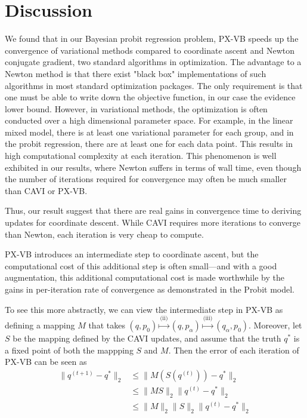 \documentclass{article}
\begin{document}
\section{Discussion}
We found that in our Bayesian probit regression problem, PX-VB speeds up the convergence of variational methods compared to coordinate ascent and Newton conjugate gradient, two standard algorithms in optimization. The advantage to a Newton method is that there exist "black box" implementations of such algorithms in most standard optimization packages. The only requirement is that one must be able to write down the objective function, in our case the evidence lower bound. However, in variational methods, the optimization is often conducted over a high dimensional parameter space. For example, in the linear mixed model, there is at least one variational parameter for each group, and in the probit regression, there are at least one for each data point. This results in high computational complexity at each iteration. This phenomenon is well exhibited in our results, where Newton suffers in terms of wall time, even though the number of iterations required for convergence may often be much smaller than CAVI or PX-VB. 

Thus, our result suggest that there are real gains in convergence time to deriving updates for coordinate descent. While CAVI requires more iterations to converge than Newton, each iteration is very cheap to compute. 


PX-VB introduces an intermediate step to coordinate ascent, but the computational cost of this additional step is often small---and with a good augmentation, this additional computational cost is made worthwhile by the gains in per-iteration rate of convergence as demonstrated in the Probit model.

To see this more abstractly, we can view the intermediate step in PX-VB as defining a mapping $M$ that takes $(q, p_0) \stackrel{\text{(ii)}}{\mapsto} (q, p_\alpha) \stackrel{\text{(iii)}}{\mapsto} (q_\alpha, p_0)$. Moreover, let $S$ be the mapping defined by the CAVI updates, and assume that the truth $q^*$ is a fixed point of both the mappping $S$ and $M$. Then the error of each iteration of PX-VB can be seen as
\begin{align}
\|q^{(t+1)} - q^*\|_2 &\leq \| M(S(q^{(t)})) - q^*\|_2 \\
&\leq \|MS\|_2 \|q^{(t)} - q^*\|_2\\
&\leq \|M\|_2\|S\|_2 \|q^{(t)} - q^*\|_2
\end{align}
\end{document}
